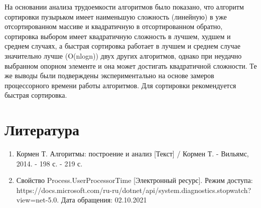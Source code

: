 \documentclass[12pt]{report}
\begin{document}
На основании анализа трудоемкости алгоритмов было показано, что алгоритм сортировки пузырьком имеет наименьшую сложность (линейную) в уже отсортированном массиве и квадратичную в отсортированном обратно, сортировка выбором имеет квадратичную сложность в лучшем, худшем и среднем случаях, а быстрая сортировка работает в лучшем и среднем случае значительно лучше (O(nlogn)) двух других алгоритмов, однако при неудачно выбранном опорном элементе и она может достигать квадратичной сложности. Те же выводы были подверждены экспериментально на основе замеров процессорного времени работы алгоритмов. 
Для сортировки рекомендуется быстрая сортировка.

\chapter*{Литература}
\begin{enumerate}
	\item Кормен Т. Алгоритмы: построение и анализ [Текст] / Кормен Т. - Вильямс, 2014. - 198 с. - 219 с.
	\item Свойство Process.UserProcessorTime [Электронный ресурс]. Режим доступа: https://docs.microsoft.com/ru-ru/dotnet/api/system.diagnostics.stopwatch?view=net-5.0. Дата обращения: 02.10.2021
\end{enumerate}
\end{document}
